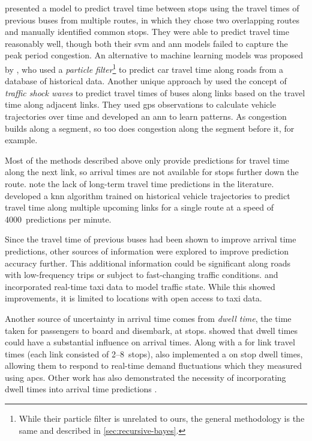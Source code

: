  presented a model to predict travel time between stops using the travel times of previous buses from multiple routes, in which they chose two overlapping routes and manually identified common stops. They were able to predict travel time reasonably well, though both their \gls{svm} and \gls{ann} models failed to capture the peak period congestion. An alternative to machine learning models was proposed by \citet{Chen_2014}, who used a \emph{particle filter}\footnote{While their particle filter is unrelated to ours, the general methodology is the same and described in \cref{sec:recursive-bayes}.} to predict car travel time along roads from a database of historical data. Another unique approach by \citet{Julio_2016} used the concept of \emph{traffic shock waves} to predict travel times of buses along links based on the travel time along adjacent links. They used \gls{gps} observations to calculate vehicle trajectories over time and developed an \gls{ann} to learn patterns. As congestion builds along a segment, so too does congestion along the segment before it, for example.


Most of the methods described above only provide predictions for travel time along the next link, so arrival times are not available for stops further down the route.  note the lack of long-term travel time predictions in the literature.  developed a \gls{knn} algorithm trained on historical vehicle trajectories to predict travel time along multiple upcoming links for a single route at a speed of 4000~predictions per minute.


Since the travel time of previous buses had been shown to improve arrival time predictions, other sources of information were explored to improve prediction accuracy further. This additional information could be significant along roads with low-frequency trips or subject to fast-changing traffic conditions.  and \citet{Ma_2019} incorporated real-time taxi data to model traffic state. While this showed improvements, it is limited to locations with open access to taxi data.


Another source of uncertainty in arrival time comes from \emph{dwell time}, the time taken for passengers to board and disembark, at stops.  showed that dwell times could have a substantial influence on arrival times. Along with a \kf{} for link travel times (each link consisted of 2--8~stops), \citeauthor{Shalaby_2004} also implemented a \kf{} on stop dwell times, allowing them to respond to real-time demand fluctuations which they measured using \glspl{apc}. Other work has also demonstrated the necessity of incorporating dwell times into arrival time predictions \citep{Jeong_2005,Cats_2015,Cats_2016}.


